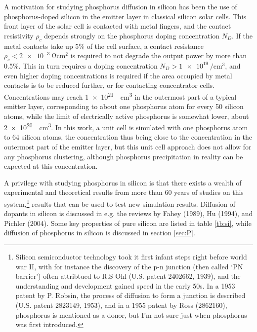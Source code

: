 \documentclass[11pt,bibliography=totoc,index=totoc]{scrbook}   %
\begin{document}
A motivation for studying phosphorus diffusion in silicon has been the use of phosphorus-doped silicon in the emitter layer in classical silicon solar cells.
This front layer of the solar cell is contacted with metal fingers, and 
the contact resistivity $\rho_c$ depends strongly on the phosphorus doping concentration $N_D$.
If the metal contacts take up 5\% of the cell surface, a contact resistance $\rho_c < \SI{2e-3}{\ohm\centi\metre\squared}$ is required to not degrade the output power by more than 0.5\%. 
This in turn requires a doping concentration $N_D > \SI{1e19}{\per\centi\metre\cubed}$,\cite{Schroder:1984} 
and even higher doping concentrations is required if the area occupied by metal contacts is to be reduced further, or for contacting concentrator cells.
Concentrations may reach \SI{1e21}{\per\centi\metre\cubed} in the outermost part of a typical emitter layer,\cite[40]{Bentzen:2006}
corresponding to about one phosphorus atom for every 50 silicon atoms,
while the limit of electrically active phosphorus is somewhat lower, about \SI{2e20}{\per\centi\metre\cubed}.\cite[40]{Bentzen:2006}
In this work, a unit cell is simulated with one phosphorus atom to 64 silicon atoms,
the concentration thus being close to the concentration in the outermost part of the emitter layer, 
but this unit cell approach does not allow for any phosphorus clustering, 
although phosphorus precipitation in reality can be expected at this concentration.


A privilege with studying phosphorus in silicon is that there exists a wealth of experimental and theoretical results from more 
than 60 years of studies on this system,\footnote{
  Silicon semiconductor technology took it first infant steps right before world war II, with for instance
  the discovery of the p-n junction (then called `PN barrier') often attribtued to R.S Ohl (U.S. patent 2402662, 1939),
  and the understanding and development gained speed in the early 50s. In a 1953 patent by P. Robsin, the process of 
  diffusion to form a junction is described (U.S. patent 2823149, 1953), and in a 1955 patent by Ross (2862160), 
  phosphorus is mentioned as a donor, but I'm not sure just when phosphorus was first introduced.
} results that can be used to test new simulation results.
Diffusion of dopants in silicon is discussed in e.g. the reviews by Fahey (1989)\cite{Fahey:1989}, Hu (1994)\cite{Hu:1994}, and Pichler (2004)\cite{Pichler:2004}.
Some key properties of pure silicon are listed in table \ref{tb:si}, while diffusion of phosphorus in silicon is discussed in section \ref{sec:P}.
\end{document}
